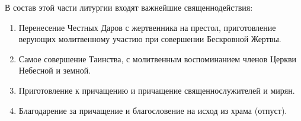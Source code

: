 В состав этой части литургии входят важнейшие священнодействия:
\begin{enumerate}

\item Перенесение Честных Даров с жертвенника на престол, приготовление верующих молитвенному участию при совершении Бескровной Жертвы.

\item Самое совершение Таинства, с молитвенным воспоминанием членов Церкви Небесной и земной. 

\item Приготовление к причащению и причащение священнослужителей и мирян.

\item Благодарение за причащение и благословение на исход из храма (отпуст).

\end{enumerate}

